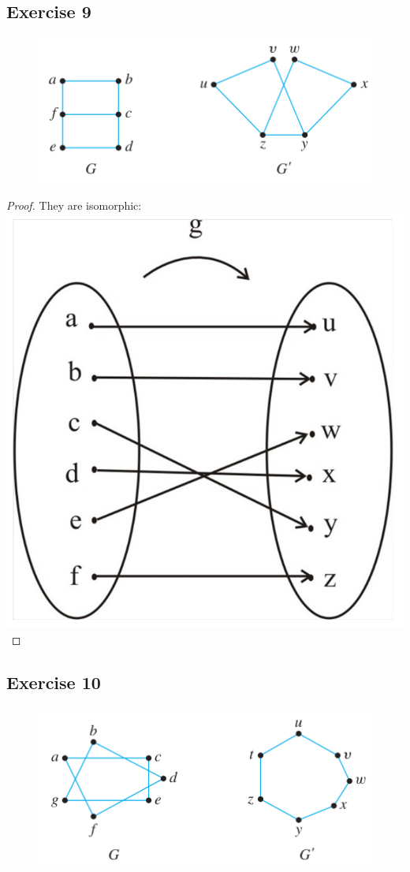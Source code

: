 \documentclass[14pt]{extarticle}
\begin{document}
\subsection{Exercise 9}
\begin{figure}[ht!]
\centering
\includegraphics[scale=0.5]{../images/10.3.9.png}
\end{figure}

\begin{proof}
They are isomorphic:
\includegraphics[scale=0.2]{../images/10.3.9.1.png}
\end{proof}

\subsection{Exercise 10}
\begin{figure}[ht!]
\centering
\includegraphics[scale=0.5]{../images/10.3.10.png}
\end{figure}
\end{document}
